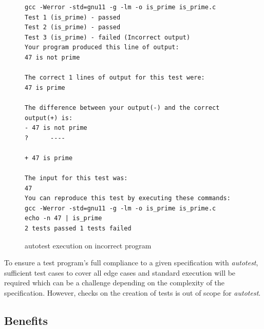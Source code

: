 \documentclass[hidelinks]{report}
\begin{document}
\clearpage
\begin{figure}[h]
	\centering
	\begin{lstlisting}[breaklines=true, linewidth=\linewidth]
gcc -Werror -std=gnu11 -g -lm -o is_prime is_prime.c
Test 1 (is_prime) - passed
Test 2 (is_prime) - passed
Test 3 (is_prime) - failed (Incorrect output)
Your program produced this line of output:
47 is not prime

The correct 1 lines of output for this test were:
47 is prime

The difference between your output(-) and the correct output(+) is:
- 47 is not prime
?      ----

+ 47 is prime

The input for this test was:
47
You can reproduce this test by executing these commands:
gcc -Werror -std=gnu11 -g -lm -o is_prime is_prime.c
echo -n 47 | is_prime
2 tests passed 1 tests failed
	\end{lstlisting}
	\caption{autotest execution on incorrect program}
	\label{fig:autotest5}
\end{figure}

To ensure a test program's full compliance to a given specification with \textit{autotest}, sufficient test cases to cover all edge cases and standard execution will be required which can be a challenge depending on the complexity of the specification. However, checks on the creation of tests is out of scope for \textit{autotest}.

\subsection{Benefits}
\end{document}
